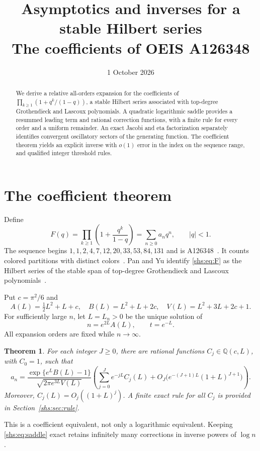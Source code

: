 \documentclass[11pt]{article}
\title{Asymptotics and inverses for a stable Hilbert series\\\large The coefficients of OEIS A126348}
\author{}
\date{1 October 2026}
\newtheorem{theorem}{Theorem}[section]
\theoremstyle{definition}
\theoremstyle{plain}
\begin{document}
\maketitle
\begin{abstract}
We derive a relative all-orders expansion for the coefficients of
$\prod_{k\ge1}(1+q^k/(1-q))$, a stable Hilbert series associated with top-degree
Grothendieck and Lascoux polynomials. A quadratic logarithmic saddle provides
a resummed leading term and rational correction functions, with a finite rule
for every order and a uniform remainder. An exact Jacobi and eta factorization
separately identifies convergent oscillatory sectors of the generating function.
The coefficient theorem yields an explicit inverse with $o(1)$ error in the
index on the sequence range, and qualified integer threshold rules.
\end{abstract}

\section{The coefficient theorem}
Define
\begin{equation}\label{shs:eq:F}
 F(q)=\prod_{k\ge1}\left(1+\frac{q^k}{1-q}\right)
     =\sum_{n\ge0}a_nq^n,\qquad |q|<1.
\end{equation}
The sequence begins $1,1,2,4,7,12,20,33,53,84,131$ and is
A126348~\cite{oeis}. It counts colored partitions with distinct
colors~\cite{NR}. Pan and Yu identify \eqref{shs:eq:F} as the Hilbert series
of the stable span of top-degree Grothendieck and Lascoux
polynomials~\cite[Proposition 6.10]{PY}.

Put $c=\pi^2/6$ and
\[
 A(L)=\tfrac12L^2+L+c,\quad B(L)=L^2+L+2c,\quad
 V(L)=L^2+3L+2c+1.
\]
For sufficiently large $n$, let $L=L_n>0$ be the unique solution of
\begin{equation}\label{shs:eq:saddle}
 n=e^{2L}A(L),\qquad t=e^{-L}.
\end{equation}
All expansion orders are fixed while $n\to\infty$.

\begin{theorem}\label{shs:thm:coeff}
For each integer $J\ge0$, there are rational functions
$C_j\in\mathbb{Q}(c,L)$, with $C_0=1$, such that
\begin{equation}\label{shs:eq:coeff}
 a_n=\frac{\exp\{e^LB(L)-1\}}{\sqrt{2\pi e^{3L}V(L)}}
 \left(\sum_{j=0}^{J}e^{-jL}C_j(L)
 +O_J\bigl(e^{-(J+1)L}(1+L)^{J+1}\bigr)\right).
\end{equation}
Moreover, $C_j(L)=O_j((1+L)^j)$. A finite exact rule for all $C_j$ is
provided in Section~\ref{shs:sec:rule}.
\end{theorem}
This is a coefficient equivalent, not only a logarithmic equivalent.
Keeping \eqref{shs:eq:saddle} exact retains infinitely many corrections in
inverse powers of $\log n$.
\end{document}
